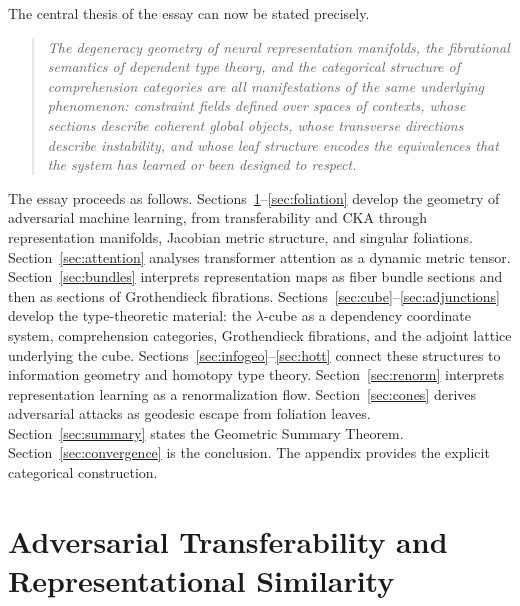 \documentclass[12pt,a4paper]{article}
\theoremstyle{plain}
\theoremstyle{definition}
\begin{document}
The central thesis of the essay can now be stated precisely.

\begin{quote}
\textit{The degeneracy geometry of neural representation manifolds, the
fibrational semantics of dependent type theory, and the categorical structure
of comprehension categories are all manifestations of the same underlying
phenomenon: constraint fields defined over spaces of contexts, whose sections
describe coherent global objects, whose transverse directions describe
instability, and whose leaf structure encodes the equivalences that the system
has learned or been designed to respect.}
\end{quote}

The essay proceeds as follows. Sections~\ref{sec:transfer}--\ref{sec:foliation}
develop the geometry of adversarial machine learning, from transferability and
CKA through representation manifolds, Jacobian metric structure, and singular
foliations. Section~\ref{sec:attention} analyses transformer attention as a
dynamic metric tensor. Section~\ref{sec:bundles} interprets representation maps
as fiber bundle sections and then as sections of Grothendieck fibrations.
Sections~\ref{sec:cube}--\ref{sec:adjunctions} develop the type-theoretic
material: the $\lambda$-cube as a dependency coordinate system,
comprehension categories, Grothendieck fibrations, and the adjoint lattice
underlying the cube. Sections~\ref{sec:infogeo}--\ref{sec:hott} connect these
structures to information geometry and homotopy type theory.
Section~\ref{sec:renorm} interprets representation learning as a renormalization
flow. Section~\ref{sec:cones} derives adversarial attacks as geodesic escape
from foliation leaves. Section~\ref{sec:summary} states the Geometric Summary
Theorem. Section~\ref{sec:convergence} is the conclusion. The appendix provides
the explicit categorical construction.

\section{Adversarial Transferability and Representational Similarity}
\label{sec:transfer}
\end{document}
